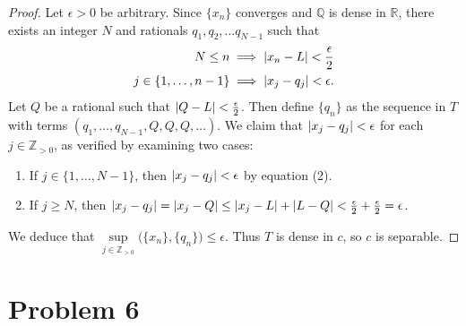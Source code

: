 \documentclass[11pt]{article}
\begin{document}
\begin{proof}
  Let $\epsilon > 0$ be arbitrary. Since $\{ x_{n} \}$ converges and $\mathbb{Q}$ is dense in $\mathbb{R}$, there exists an integer $N$ and rationals $q_{1}, q_{2}, \ldots q_{N - 1}$ such that
  \begin{align}
    N \le n &\implies \abs{x_{n} - L} < \frac{\epsilon}{2} \\
    j \in \{ 1, \ldots, n - 1 \} &\implies \abs{x_{j} - q_{j}} < \epsilon.
  \end{align}
  Let $Q$ be a rational such that $\abs{Q - L} < \tfrac{\epsilon}{2}$. Then define $\{ q_{n} \}$ as the sequence in $T$ with terms $(q_{1}, \ldots, q_{N - 1}, Q, Q, Q, \ldots)$. We claim that $\abs{x_{j} - q_{j}} < \epsilon$ for each $j \in \mathbb{Z}_{> 0}$, as verified by examining two cases:
  \begin{enumerate}
    \item If $j \in \{ 1, \ldots, N - 1 \}$, then $\abs{x_{j} - q_{j}} < \epsilon$ by equation (2).
    \item If $j \ge N$, then $\abs{x_{j} - q_{j}} = \abs{x_{j} - Q} \le \abs{x_{j} - L} + \abs{L - Q} < \tfrac{\epsilon}{2} + \tfrac{\epsilon}{2} = \epsilon$.
  \end{enumerate}
  We deduce that $\sup\limits_{j \in \mathbb{Z}_{> 0}} \big( \{ x_{n} \}, \{ q_{n} \} \big) \le \epsilon$. Thus $T$ is dense in $c$, so $c$ is separable.
\end{proof}


\section{Problem 6}
\end{document}

